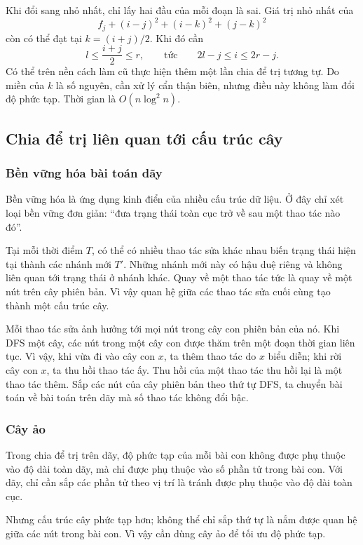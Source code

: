 \documentclass[11pt]{article}
\begin{document}
Khi đổi sang nhỏ nhất, chỉ lấy hai đầu của mỗi đoạn là sai. Giá trị nhỏ nhất
của
\[
  f_j+(i-j)^2+(i-k)^2+(j-k)^2
\]
còn có thể đạt tại \(k=(i+j)/2\). Khi đó cần
\[
  l\le \frac{i+j}{2}\le r,
  \qquad\text{tức}\qquad
  2l-j\le i\le 2r-j.
\]
Có thể trên nền cách làm cũ thực hiện thêm một lần chia để trị tương tự. Do
miền của \(k\) là số nguyên, cần xử lý cẩn thận biên, nhưng điều này không làm
đổi độ phức tạp. Thời gian là \(O(n\log^2 n)\).

\subsection{Chia để trị liên quan tới cấu trúc cây}

\subsubsection{Bền vững hóa bài toán dãy}

Bền vững hóa là ứng dụng kinh điển của nhiều cấu trúc dữ liệu. Ở đây chỉ xét
loại bền vững đơn giản: ``đưa trạng thái toàn cục trở về sau một thao tác nào
đó''.

Tại mỗi thời điểm \(T\), có thể có nhiều thao tác sửa khác nhau biến trạng thái
hiện tại thành các nhánh mới \(T'\). Những nhánh mới này có hậu duệ riêng và
không liên quan tới trạng thái ở nhánh khác. Quay về một thao tác tức là quay
về một nút trên cây phiên bản. Vì vậy quan hệ giữa các thao tác sửa cuối cùng
tạo thành một cấu trúc cây.

Mỗi thao tác sửa ảnh hưởng tới mọi nút trong cây con phiên bản của nó. Khi
DFS một cây, các nút trong một cây con được thăm trên một đoạn thời gian liên
tục. Vì vậy, khi vừa đi vào cây con \(x\), ta thêm thao tác do \(x\) biểu
diễn; khi rời cây con \(x\), ta thu hồi thao tác ấy. Thu hồi của một thao tác
thu hồi lại là một thao tác thêm. Sắp các nút của cây phiên bản theo thứ tự
DFS, ta chuyển bài toán về bài toán trên dãy mà số thao tác không đổi bậc.

\subsubsection{Cây ảo}

Trong chia để trị trên dãy, độ phức tạp của mỗi bài con không được phụ thuộc
vào độ dài toàn dãy, mà chỉ được phụ thuộc vào số phần tử trong bài con. Với
dãy, chỉ cần sắp các phần tử theo vị trí là tránh được phụ thuộc vào độ dài
toàn cục.

Nhưng cấu trúc cây phức tạp hơn; không thể chỉ sắp thứ tự là nắm được quan hệ
giữa các nút trong bài con. Vì vậy cần dùng cây ảo để tối ưu độ phức tạp.
\end{document}
